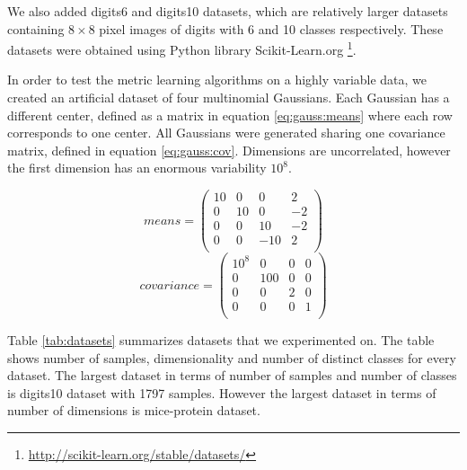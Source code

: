 \documentclass[12pt,a4paper]{report}
\begin{document}
We also added digits6 and digits10 datasets, which are relatively larger datasets containing $8\times 8$ pixel images of digits with 6 and 10 classes respectively. These datasets were obtained using Python library Scikit-Learn.org \footnote{\url{http://scikit-learn.org/stable/datasets/}}.

In order to test the metric learning algorithms on a highly variable data, we created an artificial dataset of four multinomial Gaussians. Each Gaussian has a different center, defined as a matrix in equation \eqref{eq:gauss:means} where each row corresponds to one center. All Gaussians were generated sharing one covariance matrix, defined in equation \eqref{eq:gauss:cov}. Dimensions are uncorrelated, however the first dimension has an enormous variability $10^8$.

\begin{equation} \label{eq:gauss:means}
means = \begin{pmatrix}
10 & 0 & 0 & 2 \\
0 & 10 & 0 & -2 \\
0 & 0 & 10 & -2 \\
0 & 0 & -10 & 2 \\
\end{pmatrix}
\end{equation}
\begin{equation} \label{eq:gauss:cov}
covariance = \begin{pmatrix}
10^8 & 0 & 0 & 0 \\
0 & 100 & 0 & 0 \\
0 & 0 & 2 & 0 \\
0 & 0 & 0 & 1 \\
\end{pmatrix}
\end{equation}

Table \ref{tab:datasets} summarizes datasets that we experimented on. The table shows number of samples, dimensionality and number of distinct classes for every dataset. The largest dataset in terms of number of samples and number of classes is digits10 dataset with 1797 samples. However the largest dataset in terms of number of dimensions is mice-protein dataset.
\end{document}
